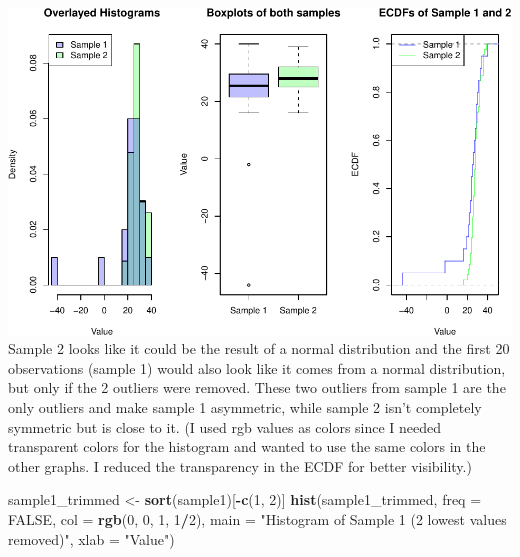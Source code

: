 \documentclass[
]{article}
\newenvironment{Shaded}{\begin{snugshade}}{\end{snugshade}}
\newcommand{\AttributeTok}[1]{\textcolor[rgb]{0.13,0.29,0.53}{#1}}
\newcommand{\ConstantTok}[1]{\textcolor[rgb]{0.56,0.35,0.01}{#1}}
\newcommand{\DecValTok}[1]{\textcolor[rgb]{0.00,0.00,0.81}{#1}}
\newcommand{\FunctionTok}[1]{\textcolor[rgb]{0.13,0.29,0.53}{\textbf{#1}}}
\newcommand{\NormalTok}[1]{#1}
\newcommand{\OtherTok}[1]{\textcolor[rgb]{0.56,0.35,0.01}{#1}}
\newcommand{\SpecialCharTok}[1]{\textcolor[rgb]{0.81,0.36,0.00}{\textbf{#1}}}
\newcommand{\StringTok}[1]{\textcolor[rgb]{0.31,0.60,0.02}{#1}}
\begin{document}
\includegraphics{SDA_submission_template_files/figure-latex/unnamed-chunk-5-1.pdf}
Sample 2 looks like it could be the result of a normal distribution and
the first 20 observations (sample 1) would also look like it comes from
a normal distribution, but only if the 2 outliers were removed. These
two outliers from sample 1 are the only outliers and make sample 1
asymmetric, while sample 2 isn't completely symmetric but is close to
it. (I used rgb values as colors since I needed transparent colors for
the histogram and wanted to use the same colors in the other graphs. I
reduced the transparency in the ECDF for better visibility.)

\begin{Shaded}
\begin{Highlighting}[]
\NormalTok{sample1\_trimmed }\OtherTok{\textless{}{-}} \FunctionTok{sort}\NormalTok{(sample1)[}\SpecialCharTok{{-}}\FunctionTok{c}\NormalTok{(}\DecValTok{1}\NormalTok{, }\DecValTok{2}\NormalTok{)]}
\FunctionTok{hist}\NormalTok{(sample1\_trimmed, }\AttributeTok{freq =} \ConstantTok{FALSE}\NormalTok{, }\AttributeTok{col =} \FunctionTok{rgb}\NormalTok{(}\DecValTok{0}\NormalTok{, }\DecValTok{0}\NormalTok{, }\DecValTok{1}\NormalTok{, }\DecValTok{1}\SpecialCharTok{/}\DecValTok{2}\NormalTok{),}
     \AttributeTok{main =} \StringTok{"Histogram of Sample 1 (2 lowest values removed)"}\NormalTok{, }\AttributeTok{xlab =} \StringTok{"Value"}\NormalTok{)}
\end{Highlighting}
\end{Shaded}
\end{document}
